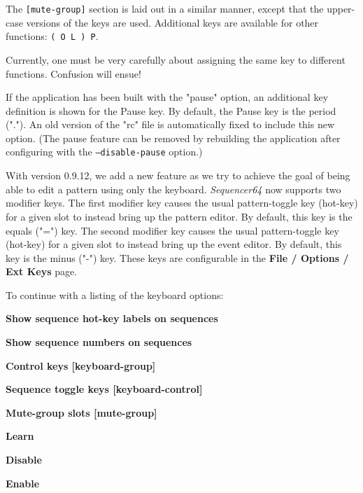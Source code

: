    The \texttt{[mute-group]} section is laid out in a similar manner, except
   that the upper-case versions of the keys are used.  Additional keys
   are available for other functions:
   \texttt{( O L ) P}.

   Currently, one must be very carefully about assigning the same key to
   different functions.  Confusion will ensue!

   If the application has been built with the "pause" option, an
   additional key definition is shown for the Pause key.
   By default, the Pause key is the period (".").  An old version of
   the "rc" file is automatically fixed to include this new option.
   (The pause feature can be removed by rebuilding the application
   after configuring with the \texttt{--disable-pause} option.)


   With version 0.9.12, we add a new feature as we try to achieve the goal of
   being able to edit a pattern using only the keyboard.
   \textsl{Sequencer64} now supports two modifier keys.
   The first modifier key causes the usual pattern-toggle key (hot-key) for a
   given slot to instead bring up the pattern editor.  By default, this key is
   the equals ("=") key.  The second modifier key causes the usual
   pattern-toggle key (hot-key) for a given slot to instead bring up the event
   editor.  By default, this key is the minus ("-") key.
   These keys are configurable in the
   \textbf{File / Options / Ext Keys} page.

   To continue with a listing of the keyboard options:

   \begin{enumber}
      \item \textbf{Show sequence hot-key labels on sequences}
      \item \textbf{Show sequence numbers on sequences}
      \item \textbf{Control keys [keyboard-group]}
      \item \textbf{Sequence toggle keys [keyboard-control]}
      \item \textbf{Mute-group slots [mute-group]}
      \item \textbf{Learn}
      \item \textbf{Disable}
      \item \textbf{Enable}
   \end{enumber}

